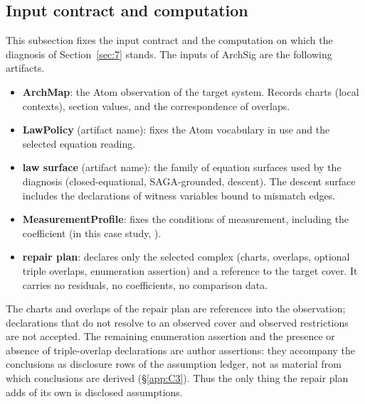\subsection{Input contract and computation}\label{app:C1}

This subsection fixes the input contract and the computation on
which the diagnosis of Section~\ref{sec:7} stands. The inputs of ArchSig are the following
artifacts.
\begin{itemize}
\item \textbf{ArchMap}: the Atom observation of the target system.
Records charts (local contexts), section values, and the
correspondence of overlaps.
\item \textbf{LawPolicy} (artifact name): fixes the Atom vocabulary in
use and the selected equation reading.
\item \textbf{law surface} (artifact name): the family of equation
surfaces used by the diagnosis (closed-equational, SAGA-grounded,
descent). The descent surface includes the declarations of witness
variables bound to mismatch edges.
\item \textbf{MeasurementProfile}: fixes the conditions of
measurement, including the coefficient (in this case study,
).
\item \textbf{repair plan}: declares only the selected complex
(charts, overlaps, optional triple overlaps, enumeration assertion)
and a reference to the target cover. It carries no residuals, no
coefficients, no comparison data.
\end{itemize}

The charts and overlaps of the repair plan are references into the
observation; declarations that do not resolve to an observed cover and
observed restrictions are not accepted. The remaining enumeration
assertion and the presence or absence of triple-overlap declarations
are author assertions: they accompany the conclusions as disclosure
rows of the assumption ledger, not as material from which conclusions
are derived (\S\ref{app:C3}). Thus the only thing the repair plan adds
of its own is disclosed assumptions.

